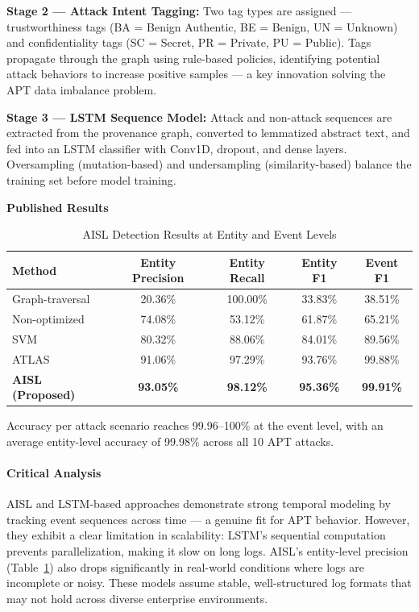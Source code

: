 \textbf{Stage 2 --- Attack Intent Tagging:} Two tag types are assigned --- trustworthiness tags (BA = Benign Authentic, BE = Benign, UN = Unknown) and confidentiality tags (SC = Secret, PR = Private, PU = Public). Tags propagate through the graph using rule-based policies, identifying potential attack behaviors to increase positive samples --- a key innovation solving the APT data imbalance problem.

\textbf{Stage 3 --- LSTM Sequence Model:} Attack and non-attack sequences are extracted from the provenance graph, converted to lemmatized abstract text, and fed into an LSTM classifier with Conv1D, dropout, and dense layers. Oversampling (mutation-based) and undersampling (similarity-based) balance the training set before model training.

\textbf{Published Results}
\begin{table}[H]
\centering
\caption{AISL Detection Results at Entity and Event Levels}
\begin{tabular}{|l|c|c|c|c|}
\hline
\textbf{Method} & \textbf{Entity Precision} & \textbf{Entity Recall} & \textbf{Entity F1} & \textbf{Event F1} \\
\hline
Graph-traversal & 20.36\% & 100.00\% & 33.83\% & 38.51\% \\
Non-optimized & 74.08\% & 53.12\% & 61.87\% & 65.21\% \\
SVM & 80.32\% & 88.06\% & 84.01\% & 89.56\% \\
ATLAS & 91.06\% & 97.29\% & 93.76\% & 99.88\% \\
\textbf{AISL (Proposed)} & \textbf{93.05\%} & \textbf{98.12\%} & \textbf{95.36\%} & \textbf{99.91\%} \\
\hline
\end{tabular}
\label{tab:aisl}
\end{table}

Accuracy per attack scenario reaches 99.96--100\% at the event level, with an average entity-level accuracy of 99.98\% across all 10 APT attacks.

\paragraph{Critical Analysis}
AISL and LSTM-based approaches demonstrate strong temporal modeling by tracking event sequences across time — a genuine fit for APT behavior. However, they exhibit a clear limitation in scalability: LSTM's sequential computation prevents parallelization, making it slow on long logs. AISL's entity-level precision (Table~\ref{tab:aisl}) also drops significantly in real-world conditions where logs are incomplete or noisy. These models assume stable, well-structured log formats that may not hold across diverse enterprise environments.

